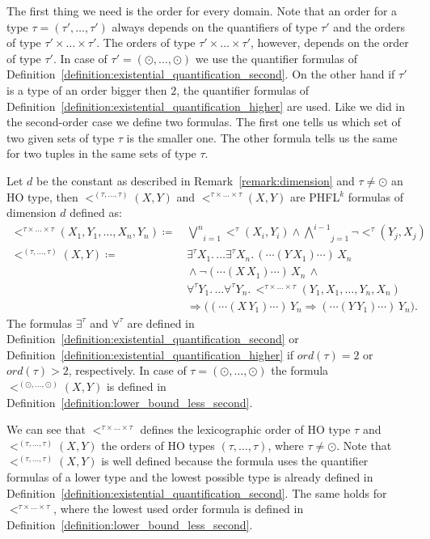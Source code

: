 The first thing we need is the order for every domain. Note that an order for a type $\tau = (\tau', \dots, \tau')$ always
depends on the quantifiers of type $\tau'$ and the orders of type $\tau' \times \dots \times \tau'$. The orders of type $\tau' \times \dots \times \tau'$, however, depends on the order of type $\tau'$. In case of $\tau' = (\odot, \dots, \odot)$ we use the quantifier formulas of Definition~\ref{definition:existential_quantification_second}. On the other hand if $\tau'$ is a type of an order bigger then $2$, the quantifier formulas of Definition~\ref{definition:existential_quantification_higher} are used. Like we did in the second-order case we define two formulas. The first
one tells us which set of two given sets of type $\tau$ is the smaller one. The other formula tells us the same for two
tuples in the same sets of type $\tau$.

\begin{definition}
    \label{definition:lower_bound_less_higher}
    Let $d$ be the constant as described in Remark~\ref{remark:dimension} and $\tau \neq \odot$ an HO
    type, then $<^{(\tau, \dots, \tau)}(X, Y)$ and $<^{\tau \times \dots \times \tau}(X, Y)$ are PHFL$^k$ formulas
    of dimension $d$ defined as:
    \begin{align*}
        <^{\tau \times \dots \times \tau}(X_1, Y_1, \dots, X_n, Y_n) \coloneqq &\,\underset{i =
        1}{\overset{n}{\bigvee}}<^{\tau}(X_i, Y_i) \wedge \underset{j = 1}{\overset{i - 1}{\bigwedge}}
        \neg <^{\tau}(Y_j, X_j)\\
        <^{(\tau, \dots, \tau)}(X, Y) \coloneqq &\,\exists^{\tau}X_1. \,\dots \exists^{\tau}X_n.\,(\dotsb(Y\,X_1)\dotsb)\,X_n\\
        &\,\wedge \neg (\dotsb(X\,X_1) \dotsb)\,X_n\,\wedge \\&\,\forall^{\tau}Y_1. \,\dots
        \forall^{\tau}Y_n.\,<^{\tau \times \dots \times \tau}
        (Y_1, X_1, \dots, Y_n, X_n) \\&\,\Rightarrow \big((\dotsb(X\,Y_1) \dotsb)\,Y_n \Rightarrow (\dotsb(Y\,Y_1)
         \dotsb)\,Y_n\big).
    \end{align*}
    The formulas $\exists^\tau$ and $\forall^\tau$ are defined in Definition~\ref{definition:existential_quantification_second} or Definition~\ref{definition:existential_quantification_higher} if $ord(\tau) = 2$ or $ord(\tau) > 2$, respectively. In case of $\tau = (\odot, \dots, \odot)$ the formula $<^{(\odot, \dots, \odot)}(X, Y)$ is defined in Definition~\ref{definition:lower_bound_less_second}.
\end{definition}
We can see that $<^{\tau \times \dots \times \tau}$ defines the lexicographic order of HO type $\tau$ and $<^{(\tau, \dots, \tau)}(X, Y)$ the orders of HO types $(\tau, \dots, \tau)$, where $\tau \neq \odot$. Note that $<^{(\tau, \dots, \tau)}(X, Y)$ is well defined because the formula uses the quantifier formulas of a lower type and the lowest possible type is already defined in Definition~\ref{definition:existential_quantification_second}. The same holds for $<^{\tau \times \dots \times \tau}$, where the lowest used order formula is defined in Definition~\ref{definition:lower_bound_less_second}. 

